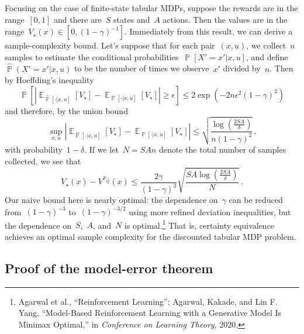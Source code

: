 \documentclass{tufte-book}
\begin{document}
Focusing on the case of finite-state tabular MDPs, suppose the rewards
are in the range~\([0,1]\) and there are~\(S\) states and~\(A\) actions.
Then the values are in the
range~\(V_\star(x) \in [0, (1-\gamma)^{-1}]\). Immediately from this
result, we can derive a sample-complexity bound. Let's suppose that for
each pair~\((x,u)\), we collect~\(n\) samples to estimate the
conditional probabilities~\(\mathop\mathbb{P}[X'=x'|x,u]\), and define
\(\hat{\mathop\mathbb{P}}(X'=x'|x,u)\) to be the number of times we
observe~\(x'\) divided by~\(n\). Then by Hoeffding's inequality \[
    \mathop\mathbb{P}\left[ \left| \mathop\mathbb{E}_{\hat{\mathop\mathbb{P}}[\cdot|x,u]}[V_\star] - \mathop\mathbb{E}_{\mathop\mathbb{P}[\cdot|x,u]}[V_\star] \right|\geq \epsilon \right]
    \leq 2\exp\left(-2n\epsilon^2 (1-\gamma)^2 \right)
\] and therefore, by the union bound \[
    \sup_{x,u} \left| \mathop\mathbb{E}_{\hat{\mathop\mathbb{P}}[\cdot|x,u]}[V_\star] - \mathop\mathbb{E}_{\mathop\mathbb{P}[\cdot|x,u]}[V_\star] \right| \leq \sqrt{\frac{\log\left(\frac{2 SA}{\delta}\right)}{n(1-\gamma)^2}}\,.
\] with probability~\(1-\delta\). If we let~\(N = SAn\) denote the total
number of samples collected, we see that \[
 V_\star(x) -   V^{\pi_{\hat{Q}}}(x) \leq \frac{2\gamma}{(1-\gamma)^3} \sqrt{\frac{SA\log\left(\frac{2 SA}{\delta}\right)}{N}}\,.
\] Our naive bound here is nearly optimal: the dependence on~\(\gamma\)
can be reduced from~\((1-\gamma)^{-3}\) to~\((1-\gamma)^{-3/2}\) using
more refined deviation inequalities, but the dependence on~\(S\),~\(A\),
and~\(N\) is optimal.\footnote{Agarwal et al., {``Reinforcement
  Learning''}; Agarwal, Kakade, and Lin F. Yang, {``Model-Based
  Reinforcement Learning with a Generative Model Is Minimax Optimal,''}
  in \emph{Conference on Learning Theory}, 2020.} That is, certainty
equivalence achieves an optimal sample complexity for the discounted
tabular MDP problem.

\hypertarget{proof-of-the-model-error-theorem}{%
\subsection{Proof of the model-error
theorem}\label{proof-of-the-model-error-theorem}}

\newcommand{\transop}[3]{{\mathcal{T}_{#1}}^{#3}#2}
\end{document}
